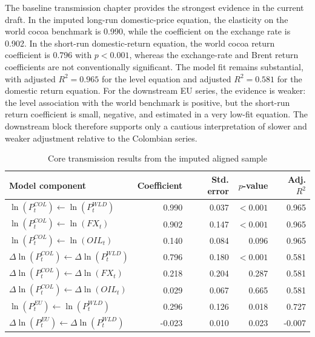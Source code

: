 \documentclass[11pt]{article}
\begin{document}
The baseline transmission chapter provides the strongest evidence in the current draft. In the imputed long-run domestic-price equation, the elasticity on the world cocoa benchmark is 0.990, while the coefficient on the exchange rate is 0.902. In the short-run domestic-return equation, the world cocoa return coefficient is 0.796 with $p<0.001$, whereas the exchange-rate and Brent return coefficients are not conventionally significant. The model fit remains substantial, with adjusted $R^2=0.965$ for the level equation and adjusted $R^2=0.581$ for the domestic return equation. For the downstream EU series, the evidence is weaker: the level association with the world benchmark is positive, but the short-run return coefficient is small, negative, and estimated in a very low-fit equation. The downstream block therefore supports only a cautious interpretation of slower and weaker adjustment relative to the Colombian series.
\begin{table}[H]
\centering
\caption{Core transmission results from the imputed aligned sample}
\label{tab:core_results}
\small
\begin{tabular}{p{5.1cm}rrrr}
\toprule
Model component & Coefficient & Std. error & $p$-value & Adj. $R^2$ \\
\midrule
$\ln(P^{COL}_{t}) \leftarrow \ln(P^{WLD}_{t})$ & 0.990 & 0.037 & $<0.001$ & 0.965 \\
$\ln(P^{COL}_{t}) \leftarrow \ln(FX_t)$ & 0.902 & 0.147 & $<0.001$ & 0.965 \\
$\ln(P^{COL}_{t}) \leftarrow \ln(OIL_t)$ & 0.140 & 0.084 & 0.096 & 0.965 \\
$\Delta \ln(P^{COL}_{t}) \leftarrow \Delta \ln(P^{WLD}_{t})$ & 0.796 & 0.180 & $<0.001$ & 0.581 \\
$\Delta \ln(P^{COL}_{t}) \leftarrow \Delta \ln(FX_t)$ & 0.218 & 0.204 & 0.287 & 0.581 \\
$\Delta \ln(P^{COL}_{t}) \leftarrow \Delta \ln(OIL_t)$ & 0.029 & 0.067 & 0.665 & 0.581 \\
$\ln(P^{EU}_{t}) \leftarrow \ln(P^{WLD}_{t})$ & 0.296 & 0.126 & 0.018 & 0.727 \\
$\Delta \ln(P^{EU}_{t}) \leftarrow \Delta \ln(P^{WLD}_{t})$ & -0.023 & 0.010 & 0.023 & -0.007 \\
\bottomrule
\end{tabular}
\normalsize
\end{table}
\end{document}
